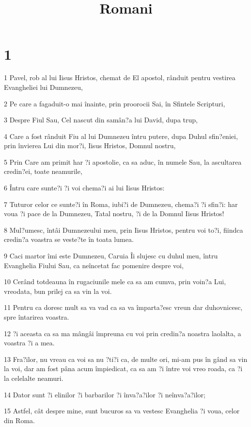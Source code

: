 

\title{Romani}


\chapter{1}

\par 1 Pavel, rob al lui Iisus Hristos, chemat de El apostol, rânduit pentru vestirea Evangheliei lui Dumnezeu,
\par 2 Pe care a fagaduit-o mai înainte, prin proorocii Sai, în Sfintele Scripturi,
\par 3 Despre Fiul Sau, Cel nascut din samân?a lui David, dupa trup,
\par 4 Care a fost rânduit Fiu al lui Dumnezeu întru putere, dupa Duhul sfin?eniei, prin învierea Lui din mor?i, Iisus Hristos, Domnul nostru,
\par 5 Prin Care am primit har ?i apostolie, ca sa aduc, în numele Sau, la ascultarea credin?ei, toate neamurile,
\par 6 Întru care sunte?i ?i voi chema?i ai lui Iisus Hristos:
\par 7 Tuturor celor ce sunte?i în Roma, iubi?i de Dumnezeu, chema?i ?i sfin?i: har voua ?i pace de la Dumnezeu, Tatal nostru, ?i de la Domnul Iisus Hristos!
\par 8 Mul?umesc, întâi Dumnezeului meu, prin Iisus Hristos, pentru voi to?i, fiindca credin?a voastra se veste?te în toata lumea.
\par 9 Caci martor îmi este Dumnezeu, Caruia Îi slujesc cu duhul meu, întru Evanghelia Fiului Sau, ca neîncetat fac pomenire despre voi,
\par 10 Cerând totdeauna în rugaciunile mele ca sa am cumva, prin voin?a Lui, vreodata, bun prilej ca sa vin la voi.
\par 11 Pentru ca doresc mult sa va vad ca sa va împarta?esc vreun dar duhovnicesc, spre întarirea voastra.
\par 12 ?i aceasta ca sa ma mângâi împreuna cu voi prin credin?a noastra laolalta, a voastra ?i a mea.
\par 13 Fra?ilor, nu vreau ca voi sa nu ?ti?i ca, de multe ori, mi-am pus în gând sa vin la voi, dar am fost pâna acum împiedicat, ca sa am ?i între voi vreo roada, ca ?i la celelalte neamuri.
\par 14 Dator sunt ?i elinilor ?i barbarilor ?i înva?a?ilor ?i neînva?a?ilor;
\par 15 Astfel, cât despre mine, sunt bucuros sa va vestesc Evanghelia ?i voua, celor din Roma.

